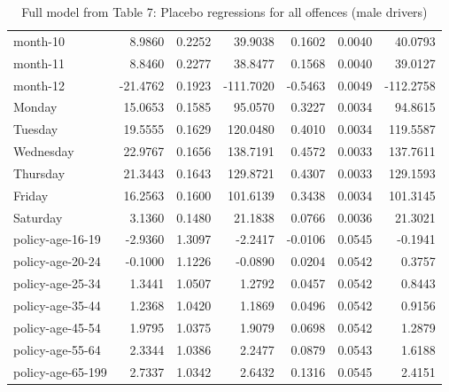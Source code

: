 \documentclass[10pt]{article}
\begin{document}
\begin{table}[ht]
\begin{tabular}{lrrrrrr}
  month-10 & 8.9860 & 0.2252 & 39.9038 & 0.1602 & 0.0040 & 40.0793 \\ 
  month-11 & 8.8460 & 0.2277 & 38.8477 & 0.1568 & 0.0040 & 39.0127 \\ 
  month-12 & -21.4762 & 0.1923 & -111.7020 & -0.5463 & 0.0049 & -112.2758 \\ 
  Monday & 15.0653 & 0.1585 & 95.0570 & 0.3227 & 0.0034 & 94.8615 \\ 
  Tuesday & 19.5555 & 0.1629 & 120.0480 & 0.4010 & 0.0034 & 119.5587 \\ 
  Wednesday & 22.9767 & 0.1656 & 138.7191 & 0.4572 & 0.0033 & 137.7611 \\ 
  Thursday & 21.3443 & 0.1643 & 129.8721 & 0.4307 & 0.0033 & 129.1593 \\ 
  Friday & 16.2563 & 0.1600 & 101.6139 & 0.3438 & 0.0034 & 101.3145 \\ 
  Saturday & 3.1360 & 0.1480 & 21.1838 & 0.0766 & 0.0036 & 21.3021 \\ 
  policy-age-16-19 & -2.9360 & 1.3097 & -2.2417 & -0.0106 & 0.0545 & -0.1941 \\ 
  policy-age-20-24 & -0.1000 & 1.1226 & -0.0890 & 0.0204 & 0.0542 & 0.3757 \\ 
  policy-age-25-34 & 1.3441 & 1.0507 & 1.2792 & 0.0457 & 0.0542 & 0.8443 \\ 
  policy-age-35-44 & 1.2368 & 1.0420 & 1.1869 & 0.0496 & 0.0542 & 0.9156 \\ 
  policy-age-45-54 & 1.9795 & 1.0375 & 1.9079 & 0.0698 & 0.0542 & 1.2879 \\ 
  policy-age-55-64 & 2.3344 & 1.0386 & 2.2477 & 0.0879 & 0.0543 & 1.6188 \\ 
  policy-age-65-199 & 2.7337 & 1.0342 & 2.6432 & 0.1316 & 0.0545 & 2.4151 \\ 
   \hline
\end{tabular}
\caption{Full model from Table 7: Placebo regressions for all offences (male drivers)} 
\label{tab_7_all_pts_with_age_M}
\end{table}


\clearpage
\pagebreak



\end{document}
